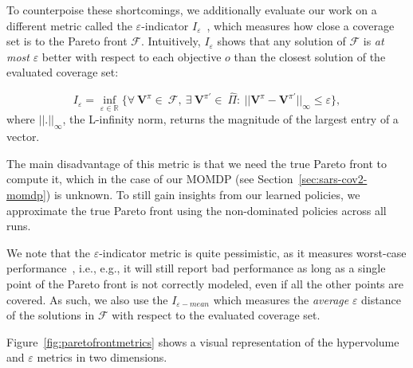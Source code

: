 \documentclass{article}
\renewcommand{\cite}[1]{\citep{#1}}
\newcommand{\momdpvaluefunction}{\mathbf{V}}
\begin{document}
To counterpoise these shortcomings, we additionally evaluate our work on a different metric called the $\varepsilon$-indicator $I_\varepsilon$~\cite{zitzler2003}, which measures how close a coverage set is to the Pareto front $\mathcal{F}$. Intuitively, $I_\varepsilon$ shows that any solution of $\mathcal{F}$ is \emph{at most} $\varepsilon$ better with respect to each objective $o$ than the closest solution of the evaluated coverage set:

\begin{equation}
\label{eq:epsilon-metric}
    I_{\varepsilon} = 
    \inf_{\varepsilon\in\mathbb{R}} 
    \{ 
    \forall\ \momdpvaluefunction^\pi\!{\in}\ \mathcal{F}, ~
    \exists\ \momdpvaluefunction^{\pi'}\!{\in}\ \hat{\Pi} :\ 
    || \momdpvaluefunction^\pi - \momdpvaluefunction^{\pi'} ||_{\infty} \le \varepsilon
    \},
\end{equation}
%
where $||.||_{\infty}$, the L-infinity norm, returns the magnitude of the largest entry of a vector.

The main disadvantage of this metric is that we need the true Pareto front to compute it, which in the case of our MOMDP (see Section~\ref{sec:sars-cov2-momdp}) is unknown. To still gain insights from our learned policies, we approximate the true Pareto front using the non-dominated policies across all runs.

We note that the $\varepsilon$-indicator metric is quite pessimistic, as it measures worst-case performance~\cite{zintgraf2015}, i.e., e.g., it will still report bad performance as long as a single point of the Pareto front is not correctly modeled, even if all the other points are covered. As such, we also use the $I_{\varepsilon-mean}$ \cite{reymond2022pcn} which measures the \emph{average} $\varepsilon$ distance of the solutions in $\mathcal{F}$ with respect to the evaluated coverage set.

Figure~\ref{fig:paretofrontmetrics} shows a visual representation of the hypervolume and $\varepsilon$ metrics in two dimensions.
\end{document}
